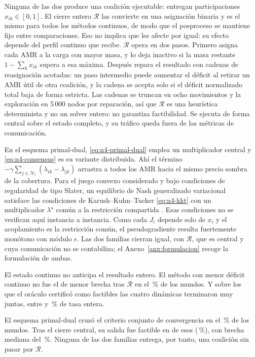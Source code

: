 \documentclass[12pt,a4paper]{article}
\theoremstyle{remark}
\theoremstyle{plain}
\begin{document}
Ninguna de las dos produce una coalición ejecutable: entregan participaciones
$x_{ik}\in[0,1]$. El cierre entero
$\mathcal R$ las convierte en una asignación binaria y es el mismo para todos los
métodos continuos, de modo que el posproceso se mantiene fijo entre
comparaciones. Eso no implica que les afecte por igual: su efecto depende del
perfil continuo que recibe. $\mathcal R$ opera en dos pasos. Primero
asigna cada AMR a la carga con mayor masa, y lo deja inactivo si la masa restante
$1-\sum_kx_{ik}$ supera a esa máxima. Después repara el resultado con cadenas de
reasignación acotadas: un paso intermedio puede aumentar el déficit al retirar un
AMR útil de otra coalición, y la cadena se acepta solo si el déficit normalizado
total baja de forma estricta. Las cadenas se truncan en ocho movimientos y la
exploración en 5\,000 nodos por reparación, así que $\mathcal R$ es una heurística
determinista y no un solver entero: no garantiza factibilidad. Se ejecuta de forma
central sobre el estado completo, y su tráfico queda fuera de las métricas de
comunicación.

En el esquema primal-dual, \eqref{eq:n4-primal-dual} emplea un multiplicador
central y \eqref{eq:n4-consensus} es su variante distribuida. Ahí el término
$-\gamma\sum_{j\in\mathcal N_i}(\lambda_{ik}-\lambda_{jk})$ arrastra a todos los
AMR hacia el mismo precio sombra de la cobertura. Para el juego convexo considerado y bajo condiciones de regularidad de tipo
Slater, un equilibrio de Nash generalizado variacional satisface las condiciones
de Karush--Kuhn--Tucker \eqref{eq:n4-kkt} con un multiplicador $\lambda^\star$
común a la restricción compartida
\citep{yi2019operatorGNE,franci2022stochasticGNE}. Esas
condiciones no se verifican aquí instancia a instancia. Como cada $J_i$ depende
solo de $x_i$ y el acoplamiento es la restricción común, el pseudogradiente resulta
fuertemente monótono con módulo $\epsilon$. Las dos familias cierran igual, con
$\mathcal R$, que es central y cuya comunicación no se contabiliza; el
Anexo~\ref{anx:formulacion} recoge la formulación de ambas.

El estado continuo no anticipa el resultado entero. El método con menor déficit continuo no
fue el de menor brecha tras $\mathcal R$ en el \NFourFiiMismatchPct\,\% de los
\NFourContWorldsN{} mundos. Y sobre los \NFourContSupportN{} que el oráculo
certificó como factibles las cuatro dinámicas terminaron muy juntas, entre
\NFourFiiRateMin{} y \NFourFiiRateMax\,\% de tasa entera.

El esquema primal-dual cruzó el criterio conjunto de convergencia en el
\NFourPdConvergencePct\,\% de los mundos. Tras el cierre central, su salida fue
factible en \NFourPdFeasibleN{} de esos \NFourPdSupportN{}
(\NFourPdFeasiblePct\,\%), con brecha mediana del \NFourPdClosedGapPct\,\%.
Ninguna de las dos familias entrega, por tanto, una coalición sin pasar por
$\mathcal R$.
\end{document}
